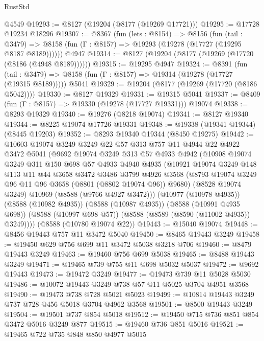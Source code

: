 \begin{lexlean}{RustStd}
\begin{coremodule}
    @4549
@19293 := @8127 (@19204 (@8177 (@19269 @17721)))
@19295 := @17728 @19234 @18296
@19307 := @8367
    (fun (lets : @8154) =>
    @8156
      (fun (tail : @3479) =>
      @8158 (fun (Γ : @8157) => @19293 (@19278 (@17727 (@19295 @8187 @8189))))))
    @4947
@19314 := @8127 (@19204 (@8177 (@19269 (@17720 (@8186 (@4948 @8189))))))
@19315 := @19295 @4947
@19324 := @8391
    (fun (tail : @3479) => @8158 (fun (Γ : @8157) => @19314 (@19278 (@17727 (@19315 @8189)))))
    @5041
@19329 := @19204 (@8177 (@19269 (@17720 (@8186 @5042))))
@19330 := @8127 @19329
@19331 := @19315 @5041
@19337 := @8409 (fun (Γ : @8157) => @19330 (@19278 (@17727 @19331))) @19074
@19338 := @8293 @19329
@19340 := @19276 (@8218 @19074)
@19341 := @8127 @19340
@19344 := @8225 @19074 @17726 @19331
@19348 := @19338 (@19341 @19344) (@8445 @19203)
@19352 := @8293 @19340 @19344 (@8450 @19275)
@19442 := @10603
    @19074
    @3249
    @3249
    @22
    @57
    @313
    @757
    @11
    @4944
    @22
    @4922
    @3472
    @5041
    (@9692
      @19074
      @3249
      @313
      @57
      @4933
      @4942
      (@10908
        @19074
        @3249
        @311
        @150
        @698
        @57
        @4933
        @4940
        @4935
        (@10921
          @19074
          @3249
          @148
          @113
          @11
          @44
          @3658
          @3472
          @3486
          @3799
          @4926
          @3568
          (@8793 @19074 @3249 @96 @11 @96 @3658 (@8801 (@8802 @19074 @96)) @9680)
          (@8528 @19074 @3249)
          @10969
          (@8588 (@9766 @4927 @3472)))
        (@10977 (@10978 @4935))
        (@8588 (@10982 @4935))
        (@8588 (@10987 @4935))
        (@8588 (@10991 @4935 @698))
        (@8588 (@10997 @698 @57))
        (@8588 (@8589 (@8590 (@11002 @4935)) @3249))))
    (@8588 (@10780 @19074 @22))
@19443 := @15040 @19074
@19448 := @8456 @19443 @757 @11 @3472 @5040
@19450 := @8465 @19443 @3249
@19458 := @19450 @629 @756 @699 @11 @3472 @5038 @3218 @706
@19460 := @8479 @19443 @3249
@19463 := @19460 @756 @699 @5038
@19465 := @8488 @19443 @3249
@19471 := @19465 @739 @755 @11 @698 @5032 @5037
@19472 := @9692 @19443
@19473 := @19472 @3249
@19477 := @19473 @739 @11 @5028 @5030
@19486 := @10072 @19443 @3249 @738 @57 @11 @5025 @3704 @4951 @3568
@19490 := @19473 @738 @728 @5021 @5023
@19499 := @10814 @19443 @3249 @737 @728 @456 @5018 @3704 @4962 @3568
@19501 := @8500 @19443 @3249
@19504 := @19501 @737 @854 @5018
@19512 := @19450 @715 @736 @851 @854 @3472 @5016 @3249 @877
@19515 := @19460 @736 @851 @5016
@19521 := @19465 @722 @735 @848 @850 @4977 @5015

\end{coremodule}
\end{lexlean}
